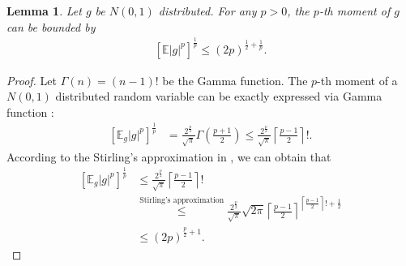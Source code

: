\documentclass{article}
\newtheorem{lemma}{Lemma}
\begin{document}
\begin{lemma}\cite{lei2015multi}
  \label{lemma-3e}
  Let $g$ be $N(0,1)$ distributed. For any $p>0$, the $p$-th moment of $g$ can be bounded by
  \begin{align}
  \label{Eqp}
    \left[\mathbb{E}|g|^p\right]^{\frac{1}{p}}\leq (2p)^{\frac{1}{2}+\frac{1}{p}}.
  \end{align}
\end{lemma}
\begin{proof}
  Let $\Gamma(n)=(n-1)!$ be the Gamma function.
  The $p$-th moment of a $N(0,1)$ distributed random variable can be exactly expressed via Gamma function \cite{winkelbauer2012moments}:
  \begin{align*}
    \left[\mathbb{E}_{g}|g|^{p}\right]^{\frac{1}{p}}&=\frac{2^{\frac{p}{2}}}{\sqrt{\pi}}\Gamma\left(\frac{p+1}{2}\right)
    \leq \frac{2^{\frac{p}{2}}}{\sqrt{\pi}}\left\lceil\frac{p-1}{2}\right\rceil!.
  \end{align*}
  According to the Stirling's approximation in \cite{robbins1955remark},
  we can obtain that
  \begin{align*}
    \left[\mathbb{E}_{g}|g|^{p}\right]^{\frac{1}{p}}
    &\leq \frac{2^{\frac{p}{2}}}{\sqrt{\pi}}\left\lceil\frac{p-1}{2}\right\rceil!\\
    &\overset{\text{Stirling's approximation}}{\leq} \frac{2^{\frac{p}{2}}}{\sqrt{\pi}}\sqrt{2\pi}\left\lceil\frac{p-1}{2}\right\rceil^{\left\lceil\frac{p-1}{2}\right\rceil!+\frac{1}{2}}\\
    &\leq (2p)^{\frac{p}{2}+1}.
  \end{align*}
\end{proof}
\end{document}
